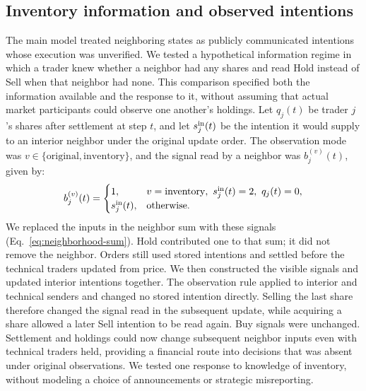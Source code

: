 \subsection{Inventory information and observed intentions}
\label{app:visibility}

The main model treated neighboring states as publicly communicated
intentions whose execution was unverified. We tested a hypothetical
information regime in which a trader knew whether a neighbor had any
shares and read Hold instead of Sell when that neighbor had none. This
comparison specified both the information available and the response to
it, without assuming that actual market participants could observe one
another's holdings. Let $q_j(t)$ be trader $j$'s shares after settlement
at step $t$, and let $s_j^{\rm in}(t)$ be the intention it would supply
to an interior neighbor under the original update order. The observation
mode was $v\in\{\mathrm{original},\mathrm{inventory}\}$, and the signal
read by a neighbor was $b_j^{(v)}(t)$, given by:
\begin{equation}
b_j^{(v)}(t)=
\begin{cases}
1, & v=\mathrm{inventory},\ s_j^{\rm in}(t)=2,\ q_j(t)=0,\\
s_j^{\rm in}(t), & \text{otherwise}.
\end{cases}
\label{eq:visible-signal}
\end{equation}
We replaced the inputs in the neighbor sum with these signals
(Eq.~\ref{eq:neighborhood-sum}). Hold contributed one to that sum; it
did not remove the neighbor. Orders still used stored intentions and
settled before the technical traders updated from price. We then
constructed the visible signals and updated interior intentions
together. The observation rule applied to interior and technical
senders and changed no stored intention directly. Selling the last
share therefore changed the signal read in the subsequent update,
while acquiring a share allowed a later Sell intention to be read
again. Buy signals were unchanged. Settlement and holdings could now
change subsequent neighbor inputs even with technical traders held,
providing a financial route into decisions that was absent under original
observations. We tested one response to knowledge
of inventory, without modeling a choice of announcements or strategic
misreporting.

